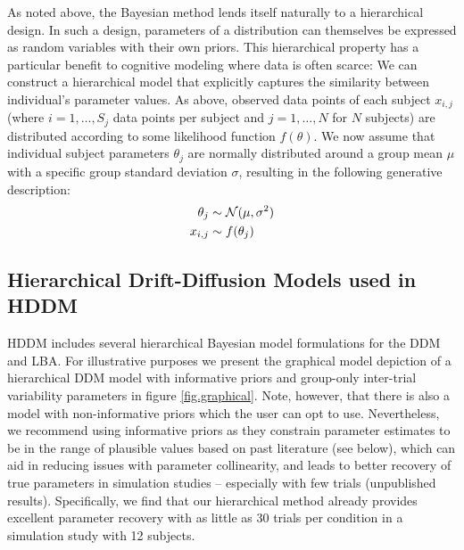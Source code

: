 \documentclass[letterpaper,10pt,english]{article}
\begin{document}
As noted above, the Bayesian method lends itself naturally to a hierarchical design. In such a design, parameters of a distribution can themselves be expressed as random variables with their own priors. This hierarchical property has a particular benefit to cognitive modeling where data is often scarce: We can construct a hierarchical model that explicitly captures the similarity between individual's parameter values. As above, observed data points of each subject $x_{i,j}$ (where $i = 1, \dots, S_j$ data points per subject and $j = 1, \dots, N$ for $N$ subjects) are distributed according to some likelihood function $f(\theta)$.  We now assume that individual subject parameters $\theta_j$ are normally distributed around a group mean $\mu$ with a specific group standard deviation $\sigma$, resulting in the following generative description:
\begin{gather}
\begin{split}
\theta_j &\sim \mathcal{N}(\mu, \sigma^2) \\
x_{i, j} &\sim f(\theta_j)\end{split}\notag
\end{gather}

\subsection*{Hierarchical Drift-Diffusion Models used in HDDM}
\label{methods:hierarchical-drift-diffusion-models-used-in-hddm}
HDDM includes several hierarchical Bayesian model formulations for the
DDM and LBA. For illustrative purposes we present the graphical model
depiction of a hierarchical DDM model with informative priors and
group-only inter-trial variability parameters in figure \ref{fig.graphical}. Note, however, that
there is also a model with non-informative priors which the user can opt to use. Nevertheless, we recommend using informative priors as they constrain parameter estimates to be in the range of plausible values based on past literature (see below), which can aid in reducing issues with parameter collinearity, and leads to better recovery of true parameters in simulation studies -- especially with few trials (unpublished results). Specifically, we find that our hierarchical method already provides excellent parameter recovery with as little as 30 trials per condition in a simulation study with 12 subjects.
\end{document}
